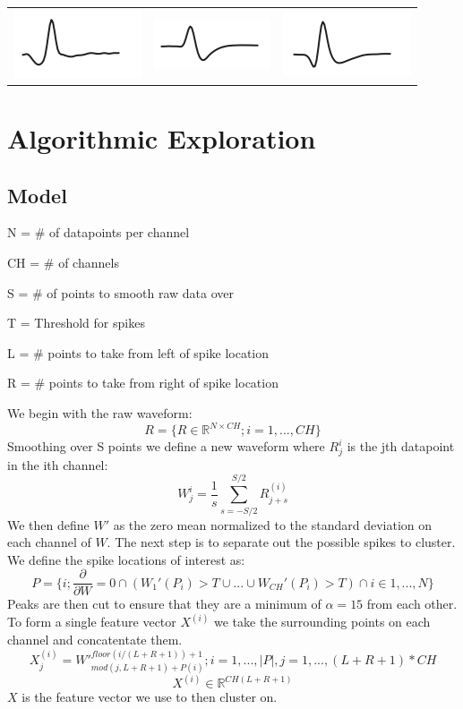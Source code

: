 \documentclass{acm_proc_article-sp}
\begin{document}
\begin{center}
  \begin{tabular}{c c c}
    \includegraphics[width=0.17\linewidth]{../poster/images/WaveShape1.png} &
    \includegraphics[width=0.17\linewidth]{../poster/images/WaveShape2.png} &
    \includegraphics[width=0.17\linewidth]{../poster/images/WaveShape3.png}
  \end{tabular}
\end{center}

\section{Algorithmic Exploration}
\subsection{Model}

N = \# of datapoints per channel

CH = \# of channels

S = \# of points to smooth raw data over

T = Threshold for spikes

L = \# points to take from left of spike location

R = \# points to take from right of spike location

We begin with the raw waveform:
$$R = \{ {R \in \mathbb{R}^{N \times CH}; i = 1,...,CH} \}$$
Smoothing over S points we define a new waveform where $R^i_j$
is the jth datapoint in the ith channel: 
$$W^i_j = \frac{1}{s}\sum_{s=-S/2}^{S/2}R^{(i)}_{j+s}$$
We then define $W'$ as the zero mean normalized to the standard
deviation on each channel of $W$. The next step is to
separate out the possible spikes to cluster. We define the
spike locations of interest as:
$$P = \{ i; \frac{\partial}{\partial W} = 0 \cap 
  (W_1'(P_i) > T \cup ... \cup W_{CH}'(P_i) > T) \cap i \in
  1,...,N \} $$
Peaks are then cut to ensure that they are a minimum of
$\alpha = 15$ from each other. To form a single feature vector $X^{(i)}$ we take the
 surrounding points on each channel and concatentate them.
 $$X^{(i)}_j = W'^{floor(i/(L+R+1))+1}_{mod(j, L+R+1) + P(i)}
  ; i = 1,...,|P|, j = 1,...,(L+R+1)*CH$$
  $$X^{(i)} \in \mathbb{R}^{CH(L+R+1)}$$
$X$ is the feature vector we use to then cluster on.
\end{document}
